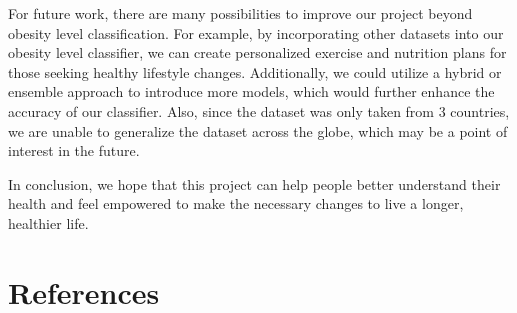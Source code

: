 \documentclass[11pt]{article}
\begin{document}
For future work, there are many possibilities to improve our project beyond obesity level classification. For example, by incorporating other datasets into our obesity level classifier, we can create personalized exercise and nutrition plans for those seeking healthy lifestyle changes. Additionally, we could utilize a hybrid or ensemble approach to introduce more models, which would further enhance the accuracy of our classifier. Also, since the dataset was only taken from 3 countries, we are unable to generalize the dataset across the globe, which may be a point of interest in the future.

In conclusion, we hope that this project can help people better understand their health and feel empowered to make the necessary changes to live a longer, healthier life. 

\newpage
\section{References}
\end{document}
